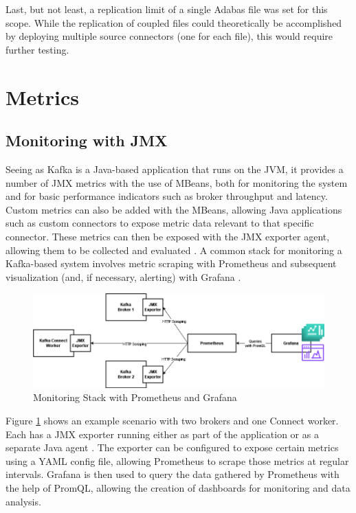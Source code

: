 Last, but not least, a replication limit of a single Adabas file was set for this scope. While the replication of coupled files could theoretically be accomplished by deploying multiple source connectors (one for each file), this would require further testing.

\section{Metrics}
\label{ch04:pipelinedevelopment:metrics}

\subsection{Monitoring with JMX}
Seeing as Kafka is a Java-based application that runs on the \ac{JVM}, it provides a number of \ac{JMX} metrics with the use of \ac{MBeans}, both for monitoring the system and for basic performance indicators such as broker throughput and latency. Custom metrics can also be added with the \ac{MBeans}, allowing Java applications such as custom connectors to expose metric data relevant to that specific connector. These metrics can then be exposed with the \ac{JMX} exporter agent, allowing them to be collected and evaluated \cite{kafkamonitoringgrafana}. A common stack for monitoring a Kafka-based system involves metric scraping with Prometheus and subsequent visualization (and, if necessary, alerting) with Grafana \cite{applicationmonitoringkafka}.

\begin{figure}[htbp]
 \centering
 \includegraphics[width=1\textwidth]{chapters/images/kafka prometheus monitoring stack.png}
 \caption{Monitoring Stack with Prometheus and Grafana}
 \label{fig:chapter04:metrics:prometheusstack}
\end{figure}

Figure \ref{fig:chapter04:metrics:prometheusstack} shows an example scenario with two brokers and one Connect worker. Each has a \ac{JMX} exporter running either as part of the application or as a separate Java agent \cite{kafkamonitoringgrafana}. The exporter can be configured to expose certain metrics using a YAML config file, allowing Prometheus to scrape those metrics at regular intervals. Grafana is then used to query the data gathered by Prometheus with the help of \ac{PromQL}, allowing the creation of dashboards for monitoring and data analysis.

